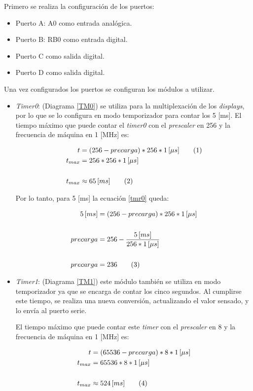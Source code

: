 \documentclass[12pt,a4paper]{article}
\newcommand\numberthis{\addtocounter{equation}{1}\tag{\theequation}}
\begin{document}
	Primero se realiza la configuración de los puertos:
	
	\begin{itemize}
	\item Puerto A: A0 como entrada analógica.
	\item Puerto B: RB0 como entrada digital.
	\item Puerto C como salida digital.
	\item Puerto D como salida digital.
	\end{itemize}
	
	Una vez configurados los puertos se configuran los módulos a utilizar.
	
	\begin{itemize}
	\item \emph{Timer0}: (Diagrama \ref{TM0}) se utiliza para la multiplexación de los \emph{displays}, por lo que se lo configura en modo temporizador para contar los 5 [ms]. El tiempo máximo que puede contar el \emph{timer0} con el \emph{prescaler} en 256 y la frecuencia de máquina en 1 [MHz] es:
	
	\begin{align*}
	\label{tmr0}
	t &= (256 - precarga) * 256 * 1\,[\mu s] \numberthis \\
	t_{max} &= 256 * 256 * 1\,[\mu s]\\
	\\t_{max} &\approx 65\,[ms] \numberthis
	\end{align*}
	
	Por lo tanto, para 5 [ms] la ecuación \ref{tmr0} queda:
	
	\begin{align*}
	5\,[ms] &= (256 - precarga) * 256 * 1\,[\mu s]\\
	\\ precarga &= 256 - \frac{5\,[ms]}{256 * 1\,[\mu s]}\\
	\\ precarga &= 236 \numberthis
	\end{align*}
	
	\item \emph{Timer1}: (Diagrama \ref{TM1}) este módulo también se utiliza en modo temporizador ya que se encarga de contar los cinco segundos. Al cumplirse este tiempo, se realiza una nueva conversión, actualizando el valor sensado, y lo envía al puerto serie.
	
	El tiempo máximo que puede contar este \emph{timer} con el \emph{prescaler} en 8 y la frecuencia de máquina en 1 [MHz] es:
	
	\begin{align*}
	\label{tmr1}
	t &= (65536 - precarga) * 8 * 1\,[\mu s]\\
	t_{max} &= 65536 * 8 * 1\,[\mu s]\\
	\\t_{max} &\approx 524\,[ms] \numberthis
	\end{align*}
	\end{itemize}
	
\end{document}
